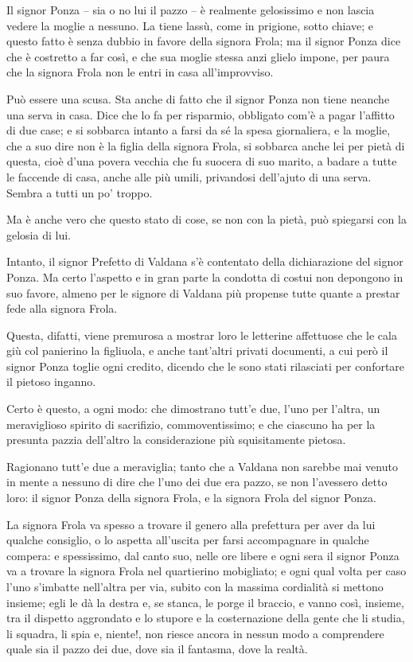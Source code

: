 \documentclass[12pt]{book}
\begin{document}
 Il signor Ponza – sia o no lui il pazzo – è realmente gelosissimo e non lascia vedere la moglie a nessuno. La tiene lassù, come in prigione, sotto chiave; e questo fatto è senza dubbio in favore della signora Frola; ma il signor Ponza dice che è costretto a far così, e che sua moglie stessa anzi glielo impone, per paura che la signora Frola non le entri in casa all’improvviso.

 Può essere una scusa. Sta anche di fatto che il signor Ponza non tiene neanche una serva in casa. Dice che lo fa per risparmio, obbligato com’è a pagar l’affitto di due case; e si sobbarca intanto a farsi da sé la spesa giornaliera, e la moglie, che a suo dire non è la figlia della signora Frola, si sobbarca anche lei per pietà di questa, cioè d’una povera vecchia che fu suocera di suo marito, a badare a tutte le faccende di casa, anche alle più umili, privandosi dell’ajuto di una serva. Sembra a tutti un po’ troppo. 

Ma è anche vero che questo stato di cose, se non con la pietà, può spiegarsi con la gelosia di lui.

Intanto, il signor Prefetto di Valdana s’è contentato della dichiarazione del signor Ponza. Ma certo l’aspetto e in gran parte la condotta di costui non depongono in suo favore, almeno per le signore di Valdana più propense tutte quante a prestar fede alla signora Frola. 

Questa, difatti, viene premurosa a mostrar loro le letterine affettuose che le cala giù col panierino la figliuola, e anche tant’altri privati documenti, a cui però il signor Ponza toglie ogni credito, dicendo che le sono stati rilasciati per confortare il pietoso inganno.

Certo è questo, a ogni modo: che dimostrano tutt’e due, l’uno per l’altra, un meraviglioso spirito di sacrifizio, commoventissimo; e che ciascuno ha per la presunta pazzia dell’altro la considerazione più squisitamente pietosa. 

Ragionano tutt’e due a meraviglia; tanto che a Valdana non sarebbe mai venuto in mente a nessuno di dire che l’uno dei due era pazzo, se non l’avessero detto loro: il signor Ponza della signora Frola, e la signora Frola del signor Ponza.

La signora Frola va spesso a trovare il genero alla prefettura per aver da lui qualche consiglio, o lo aspetta all’uscita per farsi accompagnare in qualche compera: e spessissimo, dal canto suo, nelle ore libere e ogni sera il signor Ponza va a trovare la signora Frola nel quartierino mobigliato; e ogni qual volta per caso l’uno s’imbatte nell’altra per via, subito con la massima cordialità si mettono insieme; egli le dà la destra e, se stanca, le porge il braccio, e vanno così, insieme, tra il dispetto aggrondato e lo stupore e la costernazione della gente che li studia, li squadra, li spia e, niente!, non riesce ancora in nessun modo a comprendere quale sia il pazzo dei due, dove sia il fantasma, dove la realtà.
\end{document}
